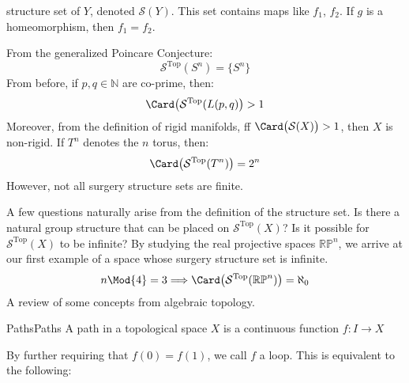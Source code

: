             structure set of $Y$,
            denoted $\mathcal{S}(Y)$. This set contains maps
            like $f_{1}$, $f_{2}$.
            If $g$ is a homeomorphism, then $f_{1}=f_{2}$.
            \begin{lexample}{}{}
                From the generalized Poincare Conjecture:
                \begin{equation}
                    \mathcal{S}^{\textrm{Top}}(S^{n})
                    =\{S^{n}\}
                \end{equation}
                From before, if $p,q\in\mathbb{N}$ are co-prime, then:
                \begin{equation}
                    \Card\big(\mathcal{S}^{\textrm{Top}}(L(p,q)\big)>1
                \end{equation}
                Moreover, from the definition of rigid manifolds,
                ff $\Card\big(\mathcal{S}(X)\big)>1$, then $X$ is non-rigid.
                If $T^{n}$ denotes the $n$ torus, then:
                \begin{equation}
                    \Card\big(\mathcal{S}^{\textrm{Top}}(T^{n})\big)
                    =2^{n}
                \end{equation}
                However, not all surgery structure sets are finite.
            \end{lexample}
            A few questions naturally arise from the
            definition of the structure set. Is there a natural group
            structure that can be placed on $\mathcal{S}^{\textrm{Top}}(X)$?
            Is it possible for $\mathcal{S}^{\textrm{Top}}(X)$ to be infinite?
            By studying the real projective spaces $\mathbb{RP}^{n}$, we
            arrive at our first example of a space whose surgery structure
            set is infinite.
            \begin{equation}
                n\Mod{4}=3
                \Longrightarrow
                \Card\big(\mathcal{S}^{\textrm{Top}}(\mathbb{RP}^{n})\big)
                =\aleph_{0}
            \end{equation}
            A review of some concepts from algebraic topology.
            \begin{ldefinition}{Paths}{Paths}
                A path in a topological space $X$ is a
                continuous function $f:I\rightarrow{X}$
            \end{ldefinition}
            By further requiring that $f(0)=f(1)$, we call $f$ a loop. This is
            equivalent to the following:
